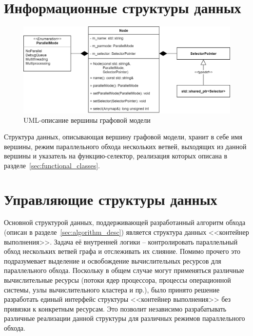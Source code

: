 \section{Информационные структуры данных}
\begin{figure}[!ht]
    \centering
    \includegraphics[height=0.25\textheight]{figures/class.node_v2.png}
    \caption{UML-описание вершины графовой модели}
    \label{fig.UMLNode}
\end{figure}

Структура данных, описывающая вершину графовой модели, хранит в себе имя вершины, режим параллельного обхода нескольких ветвей, выходящих из данной вершины и указатель на функцию-селектор, реализация которых описана в разделе~\ref{sec:functional_classes}.
\section{Управляющие структуры данных}
Основной структурой данных, поддерживающей разработанный алгоритм обхода (описан в разделе~\ref{sec:algorithm_desc}) является структура данных <<контейнер выполнения>>. Задача её внутренней логики -- контролировать параллельный обход нескольких ветвей графа и отслеживать их слияние. Помимо прочего это подразумевает выделение и освобождение вычислительных ресурсов для параллельного обхода. Поскольку в общем случае могут применяться различные вычислительные ресурсы (потоки ядер процессора, процессы операционной системы, узлы вычислительного кластера и пр.), было принято решение разработать единый интерфейс структуры <<контейнер выполнения>> без привязки к конкретным ресурсам. Это позволит независимо разрабатывать различные реализации данной структуры для различных режимов параллельного обхода.


